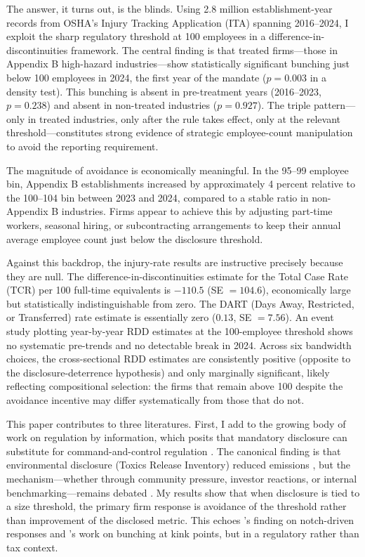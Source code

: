 \documentclass[12pt]{article}
\begin{document}
The answer, it turns out, is the blinds. Using 2.8 million establishment-year records from OSHA's Injury Tracking Application (ITA) spanning 2016--2024, I exploit the sharp regulatory threshold at 100 employees in a difference-in-discontinuities framework. The central finding is that treated firms---those in Appendix B high-hazard industries---show statistically significant bunching just below 100 employees in 2024, the first year of the mandate ($p = 0.003$ in a \citealt{mccrary2008} density test). This bunching is absent in pre-treatment years (2016--2023, $p = 0.238$) and absent in non-treated industries ($p = 0.927$). The triple pattern---only in treated industries, only after the rule takes effect, only at the relevant threshold---constitutes strong evidence of strategic employee-count manipulation to avoid the reporting requirement.

The magnitude of avoidance is economically meaningful. In the 95--99 employee bin, Appendix B establishments increased by approximately 4 percent relative to the 100--104 bin between 2023 and 2024, compared to a stable ratio in non-Appendix B industries. Firms appear to achieve this by adjusting part-time workers, seasonal hiring, or subcontracting arrangements to keep their annual average employee count just below the disclosure threshold.

Against this backdrop, the injury-rate results are instructive precisely because they are null. The difference-in-discontinuities estimate for the Total Case Rate (TCR) per 100 full-time equivalents is $-110.5$ (SE $= 104.6$), economically large but statistically indistinguishable from zero. The DART (Days Away, Restricted, or Transferred) rate estimate is essentially zero ($0.13$, SE $= 7.56$). An event study plotting year-by-year RDD estimates at the 100-employee threshold shows no systematic pre-trends and no detectable break in 2024. Across six bandwidth choices, the cross-sectional RDD estimates are consistently positive (opposite to the disclosure-deterrence hypothesis) and only marginally significant, likely reflecting compositional selection: the firms that remain above 100 despite the avoidance incentive may differ systematically from those that do not.

This paper contributes to three literatures. First, I add to the growing body of work on regulation by information, which posits that mandatory disclosure can substitute for command-and-control regulation \citep{jin2003, dranove2003, greenstone2006}. The canonical finding is that environmental disclosure (Toxics Release Inventory) reduced emissions \citep{hamilton1995, konar1997}, but the mechanism---whether through community pressure, investor reactions, or internal benchmarking---remains debated \citep{bui2018}. My results show that when disclosure is tied to a size threshold, the primary firm response is avoidance of the threshold rather than improvement of the disclosed metric. This echoes \citet{benzarti2020}'s finding on notch-driven responses and \citet{kleven2011}'s work on bunching at kink points, but in a regulatory rather than tax context.
\end{document}
